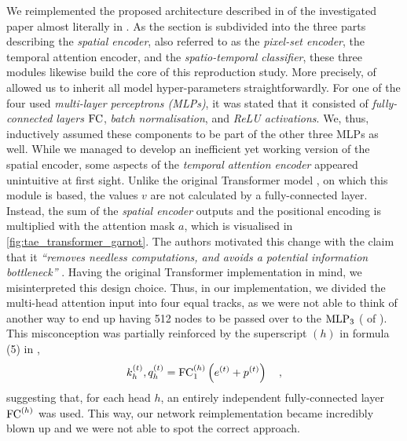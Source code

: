 We reimplemented the proposed architecture described in  of the investigated paper almost literally in \python.
As the section is subdivided into the three parts describing the \emph{spatial encoder}, also referred to as the \emph{pixel-set encoder}, the temporal attention encoder, and the \emph{spatio-temporal classifier}, these three modules likewise build the core of this reproduction study.
More precisely,  of \textcite{Garnot20:SIT} allowed us to inherit all model hyper-parameters straightforwardly.
For one of the four used \emph{multi-layer perceptrons (MLPs)}, it was stated that it consisted of \emph{fully-connected layers} $\operatorname{FC}$, \emph{batch normalisation}, and \emph{ReLU activations}.
We, thus, inductively assumed these components to be part of the other three MLPs as well.
While we managed to develop an inefficient yet working version of the {spatial encoder}, some aspects of the \emph{temporal attention encoder} appeared unintuitive at first sight.
Unlike the original Transformer model \parencite{Vaswani17:Attention}, on which this module is based, the values $v$ are not calculated by a fully-connected layer.
Instead, the sum of the \emph{spatial encoder} outputs and the positional encoding is multiplied with the attention mask $a$, which is visualised in \cref{fig:tae_transformer_garnot}.
The authors motivated this change with the claim that it \emph{\enquote{removes needless computations, and avoids a potential information bottleneck}} \parencite[\cf][Section 3.2.]{Garnot20:SIT}.
Having the original Transformer implementation in mind, we misinterpreted this design choice.
Thus, in our implementation, we divided the multi-head attention input into four equal tracks, as we were not able to think of another way to end up having \num{512} nodes to be passed over to the $\operatorname{MLP}_3$ (\cf {} of \cite{Garnot20:SIT}).
This misconception was partially reinforced by the superscript $(h)$ in formula (5) in \cite{Garnot20:SIT}, \ie
\begin{equation}
    k_h^{(t)}, q_h^{(t)} = \operatorname{FC}_1^{(h)} \left(e^{(t)} + p^{(t)} \right) \quad ,
\end{equation}
suggesting that, for each head $h$, an entirely independent fully-connected layer $\operatorname{FC}^{(h)}$ was used.
This way, our network reimplementation became incredibly blown up and we were not able to spot the correct approach.


